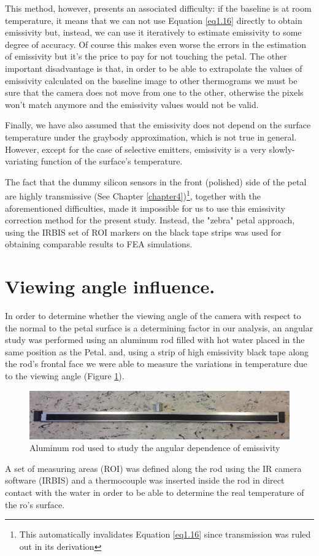 		This method, however, presents an associated difficulty: if the baseline is at room temperature, it means that we can not use Equation \ref{eq1.16} directly to obtain emissivity but, instead, we can use it iteratively to estimate emissivity to some degree of accuracy. Of course this makes even worse the errors in the estimation of emissivity but it’s the price to pay for not touching the petal. The other important disadvantage is that, in order to be able to extrapolate the values of emissivity calculated on the baseline image to other thermograms we must be sure that the camera does not move from one to the other, otherwise the pixels won’t match anymore and the emissivity values would not be valid.
		
		Finally, we have also assumed that the emissivity does not depend on the surface temperature under the graybody approximation, which is not true in general. However, except for the case of selective emitters, emissivity is a very slowly-variating function of the surface’s temperature.
		
		The fact that the dummy silicon sensors in the front (polished) side of the petal are highly transmissive (See Chapter \ref{chapter4})\footnote{This automatically invalidates Equation \ref{eq1.16} since transmission was ruled out in its derivation}, together with the aforementioned difficulties, made it impossible for us to use this emissivity correction method for the present study. Instead, the "zebra" petal approach, using the IRBIS set of ROI markers on the black tape strips was used for obtaining comparable results to FEA simulations.\bigskip
		
	\section{Viewing angle influence.}\label{section3.4}
	
		In order to determine whether the viewing angle of the camera with respect to the normal to the petal surface is a determining factor in our analysis, an angular study was performed using an aluminum rod filled with hot water placed in the same position as the Petal.  and, using a strip of high emissivity black tape along the rod’s frontal face we were able to measure the variations in temperature due to the viewing angle (Figure \ref{fig3.4}).
	
		\begin{figure}[H]
			\centering
			\captionsetup{justification=centering,margin=2cm}
			\includegraphics[scale=0.30]{Figures/Chapter03/AluminumRod.jpg}
			\caption{Aluminum rod used to study the angular dependence of emissivity}\label{fig3.4}
		\end{figure}		
		
		A set of measuring areas (ROI) was defined along the rod using the IR camera software (IRBIS) and a thermocouple was inserted inside the rod in direct contact with the water in order to be able to determine the real temperature of the ro’s surface.
	
	